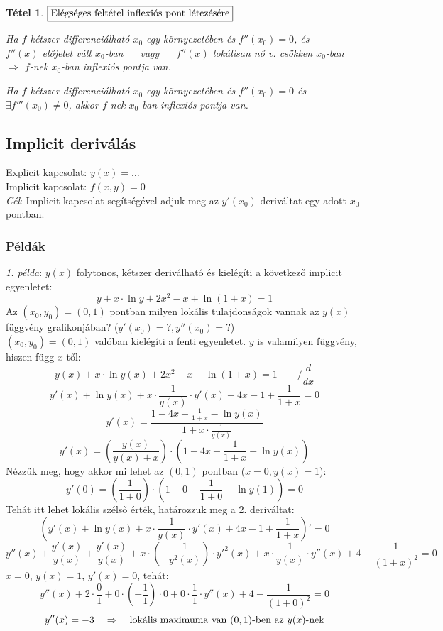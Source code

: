\documentclass[a4paper,12pt,twoside]{book}
\newtheorem{tetel}{Tétel}[chapter]
\theoremstyle{break}
\theoremstyle{plain}
\begin{document}
\begin{tetel} $\boxed{$Elégséges feltétel inflexiós pont létezésére$}$
 \begin{enumerate*}
  \item Ha $f$ kétszer differenciálható $x_0$ egy környezetében és $f''(x_0)=0$, és\\
  $f''(x)$ előjelet vált $x_0$-ban $\quad$ vagy $\quad$ $f''(x)$ lokálisan nő v. csökken $x_0$-ban\\
  $\Rightarrow$ $f$-nek $x_0$-ban inflexiós pontja van.
  \item Ha $f$ kétszer differenciálható $x_0$ egy környezetében és $f''(x_0)=0$ és $\exists f'''(x_0)\neq 0$, akkor $f$-nek $x_0$-ban inflexiós pontja van.
 \end{enumerate*}
\end{tetel}
\addtocounter{biz}{1}

\subsection{Implicit deriválás}

Explicit kapcsolat: $y(x)=\ldots$\\
Implicit kapcsolat: $f(x,y)=0$\\
\emph{Cél}: Implicit kapcsolat segítségével adjuk meg az $y'(x_0)$ deriváltat egy adott $x_0$ pontban.

\subsubsection{Példák}

\emph{1. példa}: $y(x)$ folytonos, kétszer deriválható és kielégíti a következő implicit egyenletet:
\[y+x\cdot \ln y + 2x^2-x+\ln(1+x)=1\]
Az $(x_0, y_0)=(0,1)$ pontban milyen lokális tulajdonságok vannak az $y(x)$ függvény grafikonjában? ($y'(x_0)=?, y''(x_0)=?$)\\

$(x_0, y_0)=(0,1)$ valóban kielégíti a fenti egyenletet. $y$ is valamilyen függvény, hiszen függ $x$-től:
\[y(x)+x\cdot \ln y(x) + 2x^2-x+\ln(1+x)=1 \qquad /\dfrac{d}{dx}\]
\[y'(x)+\ln y(x)+x\cdot \frac{1}{y(x)}\cdot y'(x) + 4x-1+\frac{1}{1+x}=0\]
\[y'(x)= \frac{1-4x-\frac{1}{1+x}-\ln y(x)}{1+x\cdot \frac{1}{y(x)}}\]
\[y'(x)= \left(\frac{y(x)}{y(x)+x}\right)\cdot\left(1-4x-\frac{1}{1+x}-\ln y(x)\right)\]
Nézzük meg, hogy akkor mi lehet az $(0,1)$ pontban ($x=0, y(x)=1$):
\[y'(0)= \left(\frac{1}{1+0}\right)\cdot\left(1-0-\frac{1}{1+0}-\ln y(1)\right) = 0\]
Tehát itt lehet lokális szélső érték, határozzuk meg a 2. deriváltat:
\[\left(y'(x)+\ln y(x)+x\cdot \frac{1}{y(x)}\cdot y'(x) + 4x-1+\frac{1}{1+x}\right)'=0\]
\[y''(x)+\frac{y'(x)}{y(x)}+\frac{y'(x)}{y(x)}+x\cdot \left(-\frac{1}{y^2(x)}\right)\cdot y'^2(x)+x\cdot \frac{1}{y(x)}\cdot y''(x) + 4-\frac{1}{(1+x)^2}=0\]
$x=0$, $y(x)=1$, $y'(x)=0$, tehát:
\[y''(x)+2\cdot\frac{0}{1}+0\cdot \left(-\frac{1}{1}\right)\cdot 0+0\cdot \frac{1}{1}\cdot y''(x) + 4-\frac{1}{(1+0)^2}=0\]
\[y''(x) = -3 \quad \Rightarrow \quad \hbox{lokális maximuma van $(0,1)$-ben az $y(x)$-nek}\]\\
\end{document}
